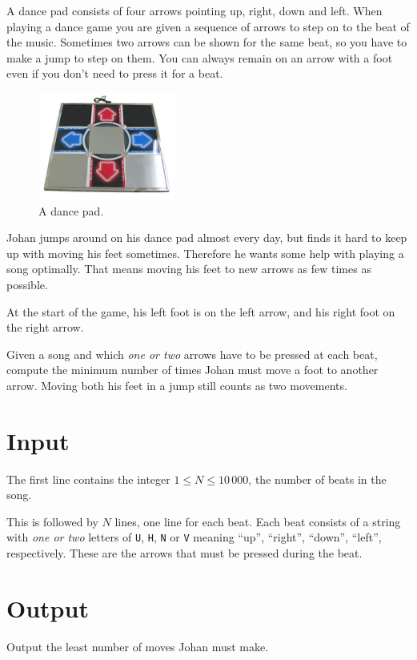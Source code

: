 A dance pad consists of four arrows pointing up, right, down and left.
When playing a dance game you are given a sequence of arrows to step on to the beat of the music.
Sometimes two arrows can be shown for the same beat, so you have to make a jump to step on them.
You can always remain on an arrow with a foot even if you don't need to press it for a beat.

\begin{figure}[ht!]
\centering
\includegraphics[width=0.4\textwidth]{dansmatta.png}
\caption{A dance pad.}
\end{figure}

Johan jumps around on his dance pad almost every day, but finds it hard to keep up with moving his feet sometimes.
Therefore he wants some help with playing a song optimally.
That means moving his feet to new arrows as few times as possible.

At the start of the game, his left foot is on the left arrow, and his right foot on the right arrow.

Given a song and which \emph{one or two} arrows have to be pressed at each beat, compute the minimum number of times Johan must move a foot to another arrow.
Moving both his feet in a jump still counts as two movements.


\section*{Input}
The first line contains the integer $1 \le N \le 10\,000$, the number of beats in the song.

This is followed by $N$ lines, one line for each beat.
Each beat consists of a string with \emph{one or two} letters of \texttt{U}, \texttt{H}, \texttt{N} or \texttt{V} meaning ``up'', ``right'', ``down'', ``left'', respectively.
These are the arrows that must be pressed during the beat.

\section*{Output}
Output the least number of moves Johan must make.

